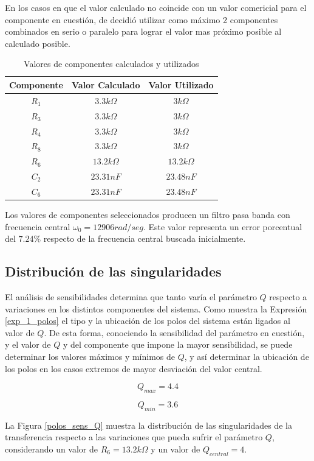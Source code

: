 En los casos en que el valor calculado no coincide con un valor comericial para el componente en cuestión, de decidió utilizar como máximo 2 componentes combinados en serio o paralelo para lograr el valor mas próximo posible al calculado posible.
\smallskip

\begin{table}[h]
\centering
\begin{tabular}{|c|c|c|}
\hline 
Componente & Valor Calculado & Valor Utilizado \\ 
\hline 
$R_1$ & $3.3k\Omega$ & $3k\Omega$ \\ 
\hline 
$R_3$ & $3.3k\Omega$ & $3k\Omega$ \\
\hline 
$R_4$ & $3.3k\Omega$ & $3k\Omega$ \\ 
\hline 
$R_8$ & $3.3k\Omega$ & $3k\Omega$ \\ 
\hline 
$R_6$ & $13.2k\Omega$ & $13.2k\Omega$ \\
\hline 
$C_2$ & $23.31nF$ & $23.48nF$ \\
\hline 
$C_6$ & $23.31nF$ & $23.48nF$ \\
\hline 
\end{tabular} 
\caption{Valores de componentes calculados y utilizados}
\end{table}

Los valores de componentes seleccionados producen un filtro pasa banda con frecuencia central $\omega_0 = 12906 rad/seg$. Este valor representa un error porcentual del $7.24\%$ respecto de la frecuencia central buscada inicialmente.

\subsection{Distribución de las singularidades}
El análisis de sensibilidades determina que tanto varía el parámetro $Q$ respecto a variaciones en los distintos componentes del sistema. Como muestra la Expresión \ref{exp_1_polos} el tipo y la ubicación de los polos del sistema están ligados al valor de $Q$. De esta forma, conociendo la sensibilidad del parámetro en cuestión, y el valor de $Q$ y del componente que impone la mayor sensibilidad, se puede determinar los valores máximos y mínimos de $Q$, y así determinar la ubicación de los polos en los casos extremos de mayor desviación del valor central.

\[
Q_{max} = 4.4
\]

\[
Q_{min} = 3.6
\]

La Figura \ref{polos_sens_Q} muestra la distribución de las singularidades de la transferencia respecto a las variaciones que pueda sufrir el parámetro $Q$, considerando un valor de $R_6 = 13.2k\Omega$ y un valor de $Q_{central} = 4$.

